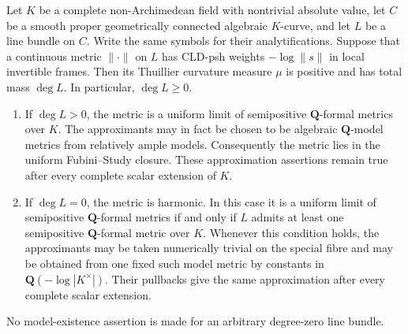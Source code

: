 \begin{theorem}
\label{thm:p081-corrected-curve-comparison}
Let $K$ be a complete non-Archimedean field with nontrivial absolute
value, let $C$ be a smooth proper geometrically connected algebraic
$K$-curve, and let $L$ be a line bundle on $C$.  Write the same
symbols for their analytifications.  Suppose that a continuous metric
$\lVert\cdot\rVert$ on $L$ has CLD-psh weights
$-\log\lVert s\rVert$ in local invertible frames.  Then its Thuillier
curvature measure $\mu$ is positive and has total mass $\deg L$.
In particular, $\deg L\geq0$.
\begin{enumerate}
\item\label{itm:p081-corrected-positive}
  If $\deg L>0$, the metric is a uniform limit of semipositive
  $\mathbf Q$-formal metrics over $K$.  The approximants may in fact
  be chosen to be algebraic $\mathbf Q$-model metrics from relatively
  ample models.  Consequently the metric lies in the uniform
  Fubini--Study closure.  These approximation assertions remain true
  after every complete scalar extension of $K$.
\item\label{itm:p081-corrected-zero}
  If $\deg L=0$, the metric is harmonic.  In this case it is a uniform
  limit of semipositive $\mathbf Q$-formal metrics if and only if
  $L$ admits at least one semipositive $\mathbf Q$-formal metric over
  $K$.  Whenever this condition holds, the approximants may be taken
  numerically trivial on the special fibre and may be obtained from
  one fixed such model metric by constants in
  $\mathbf Q(-\log|K^\times|)$.  Their pullbacks give the same
  approximation after every complete scalar extension.
\end{enumerate}
No model-existence assertion is made for an arbitrary degree-zero line
bundle.
\end{theorem}
